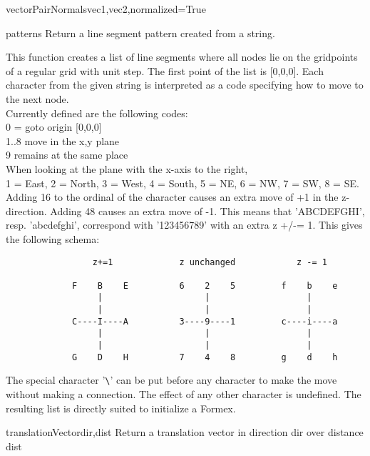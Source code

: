 {{\begin{funcdesc}{vectorPairNormals}{vec1,vec2,normalized=True}
\end{funcdesc}


\begin{funcdesc}{pattern}{s}
Return a line segment pattern created from a string.

This function creates a list of line segments where all nodes lie on the gridpoints of a regular grid with unit step.
The first point of the list is [0,0,0]. Each character from the given string is interpreted as a code specifying how to move to the next node.\\
Currently defined are the following codes:\\
0 = goto origin [0,0,0]\\
1..8 move in the x,y plane\\
9 remains at the same place\\
When looking at the plane with the x-axis to the right,\\
1 = East, 2 = North, 3 = West, 4 = South, 5 = NE, 6 = NW, 7 = SW, 8 = SE.\\
Adding 16 to the ordinal of the character causes an extra move of +1 in the z-direction. Adding 48 causes an extra move of -1. This means that 'ABCDEFGHI', resp. 'abcdefghi', correspond with '123456789' with an extra z +/-= 1. This gives the following schema:
\begin{verbatim}
                 z+=1             z unchanged            z -= 1
            
             F    B    E          6    2    5         f    b    e 
                  |                    |                   |     
                  |                    |                   |     
             C----I----A          3----9----1         c----i----a  
                  |                    |                   |     
                  |                    |                   |     
             G    D    H          7    4    8         g    d    h
\end{verbatim}             
The special character '\verb?\?' can be put before any character to make the move without making a connection. The effect of any other character is undefined. The resulting list is directly suited to initialize a Formex.
\end{funcdesc}


\begin{funcdesc}{translationVector}{dir,dist}
    Return a translation vector in direction dir over distance dist
\end{funcdesc}

}}
